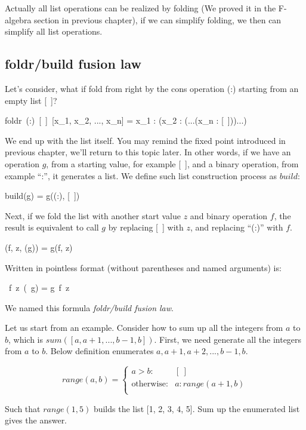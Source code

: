 \documentclass[b5paper]{article}
\begin{document}
Actually all list operations can be realized by folding (We proved it in the F-algebra section in previous chapter), if we can simplify folding, we then can simplify all list operations.

\subsection{foldr/build fusion law}
Let's consider, what if fold from right by the cons operation (:) starting from an empty list [\ ]?

\be
foldr\ (:)\ [\ ]\ [x_1, x_2, ..., x_n] = x_1 : (x_2 : (...(x_n : [\ ]))...)
\label{eq:foldr-fixed-point}
\ee

We end up with the list itself. You may remind the fixed point introduced in previous chapter, we'll return to this topic later. In other words, if we have an operation $g$, from a starting value, for example [\ ], and a binary operation, from example ``:'', it generates a list. We define such list construction process as $build$:

\be
build(g) = g((:), [\ ])
\label{eq:build-definition}
\ee

Next, if we fold the list with another start value $z$ and binary operation $f$, the result is equivalent to call $g$ by replacing [\ ] with $z$, and replacing ``(:)'' with $f$.

\be
{}(f, z, (g)) = g(f, z)
\ee

Written in pointless format (without parentheses and named arguments) is:

\be
{}\ f\ z\ (\ g) = g\ f\ z
\label{eq:foldr-build-fusion-law}
\ee

We named this formula {\em foldr/build fusion law}.

Let us start from an example. Consider how to sum up all the integers from $a$ to $b$, which is $sum([a, a+1, ..., b-1, b])$. First, we need generate all the integers from $a$ to $b$. Below definition enumerates $a, a+1, a+2, ..., b-1, b$.

\[
range(a, b) =
\begin{cases}
a > b: & [\ ] \\
\text{otherwise}: & a : range(a+1, b) \\
\end{cases}
\]

Such that $range(1, 5)$ builds the list [1, 2, 3, 4, 5]. Sum up the enumerated list gives the answer.
\end{document}
